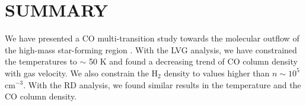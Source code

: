 \section{SUMMARY}\label{summary}

We have presented a CO multi-transition study towards the molecular outflow of the high-mass star-forming region . With the LVG analysis, we have constrained the temperatures to $\sim$ 50 K and found a decreasing trend of CO column density with gas velocity. We also constrain the H$_2$ density to values higher than $n \sim 10^5$ cm$^{-3}$. With the RD analysis, we found similar results in the temperature and the CO column density.
